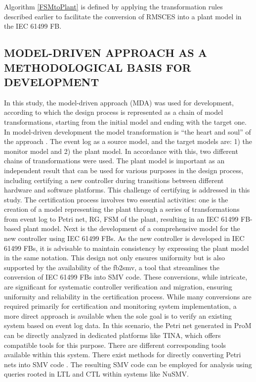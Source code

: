 \documentclass{ieeeojies}
\begin{document}
Algorithm \ref{FSMtoPlant} is defined by applying the transformation rules described earlier to facilitate the conversion of  RMSCES into a plant model in the IEC 61499 FB.


\subsection{MODEL-DRIVEN APPROACH AS A METHODOLOGICAL BASIS FOR DEVELOPMENT}

In this study, the model-driven approach (MDA) was used for development, according to which the design process is represented as a chain of model transformations, starting from the initial model and ending with the target one. In model-driven development the model transformation is “the heart and soul” of the approach \cite{sendall2003model}.
The event log as a source model, and the target models are: 1) the monitor model and 2) the plant model. In accordance with this, two different chains of transformations were used. The plant model is important as an independent result that can be used for various purposes in the design process, including certifying a new controller during transitions between different hardware and software platforms. This challenge of certifying is addressed in this study.
The certification process involves two essential activities: one is the creation of a model representing the plant through a series of transformations from event log to Petri net, RG, FSM of the plant, resulting in an IEC 61499 FB-based plant model. Next is the development of a comprehensive model for the new controller using IEC 61499 FBs. As the new controller is developed in IEC 61499 FBs, it is advisable to maintain consistency by expressing the plant model in the same notation. This design not only ensures uniformity but is also supported by the availability of the fb2smv, a tool that streamlines the conversion of IEC 61499 FBs into SMV code. These conversions, while intricate, are significant for systematic controller verification and migration, ensuring uniformity and reliability in the certification process. While many conversions are required primarily for certification and monitoring system implementation, a more direct approach is available when the sole goal is to verify an existing system based on event log data. In this scenario, the Petri net generated in ProM can be directly analyzed in dedicated platforms like TINA, which offers compatible tools for this purpose. There are different corresponding tools available within this system. There exist methods for directly converting Petri nets into SMV code \cite{wimmel1997bdd}. The resulting SMV code can be employed for analysis using queries rooted in LTL and CTL within systems like NuSMV.
\end{document}
